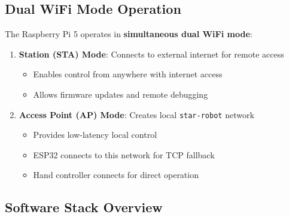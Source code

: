 \documentclass[11pt,letterpaper]{article}
\begin{document}
\subsection{Dual WiFi Mode Operation}

The Raspberry Pi 5 operates in \textbf{simultaneous dual WiFi mode}:

\begin{enumerate}
    \item \textbf{Station (STA) Mode}: Connects to external internet for remote access
    \begin{itemize}
        \item Enables control from anywhere with internet access
        \item Allows firmware updates and remote debugging
    \end{itemize}

    \item \textbf{Access Point (AP) Mode}: Creates local \texttt{star-robot} network
    \begin{itemize}
        \item Provides low-latency local control
        \item ESP32 connects to this network for TCP fallback
        \item Hand controller connects for direct operation
    \end{itemize}
\end{enumerate}

\subsection{Software Stack Overview}
\end{document}
